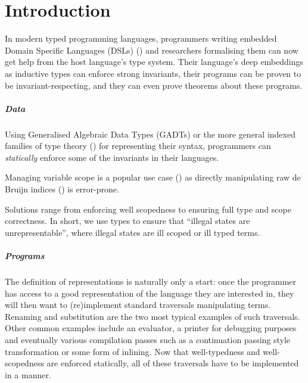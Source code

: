 \chapter{Introduction}
\label{introduction}

In modern typed programming languages, programmers writing embedded Domain
Specific Languages (DSLs) (\cite{hudak1996building}) and researchers
formalising them can now get help from the host language's type system.
Their language's deep embeddings as inductive types can enforce strong
invariants, their programs can be proven to be invariant-respecting,
and they can even prove theorems about these programs.

\paragraph{Data} Using Generalised Algebraic Data Types (GADTs) or the more
general indexed families of type theory (\cite{dybjer1994inductive}) for
representing their syntax, programmers can \emph{statically} enforce some of
the invariants in their languages.

Managing variable scope is a popular use case
(\cite{BELLEGARDE1994287,bird_paterson_1999,altenkirch1999monadic}) as directly
manipulating raw de Bruijn indices (\cite{de1972lambda}) is error-prone.


Solutions range from enforcing well scopedness to ensuring full type and scope
correctness. In short, we use types to ensure that ``illegal states are unrepresentable'',
where illegal states are ill scoped or ill typed terms.

\paragraph{Programs} The definition of \scopeandtypesafe{} representations is naturally only a start:
once the programmer has access to a good representation of the language they are
interested in, they will then want to (re)implement standard traversals
manipulating terms. Renaming and substitution are the two most typical examples
of such traversals. Other common examples include an evaluator, a printer for
debugging purposes and eventually various compilation passes such as a continuation
passing style transformation or some form of inlining. Now that well-typedness
and well-scopedness are enforced statically, all of these traversals have to be
implemented in a \scopeandtypesafe{} manner.

